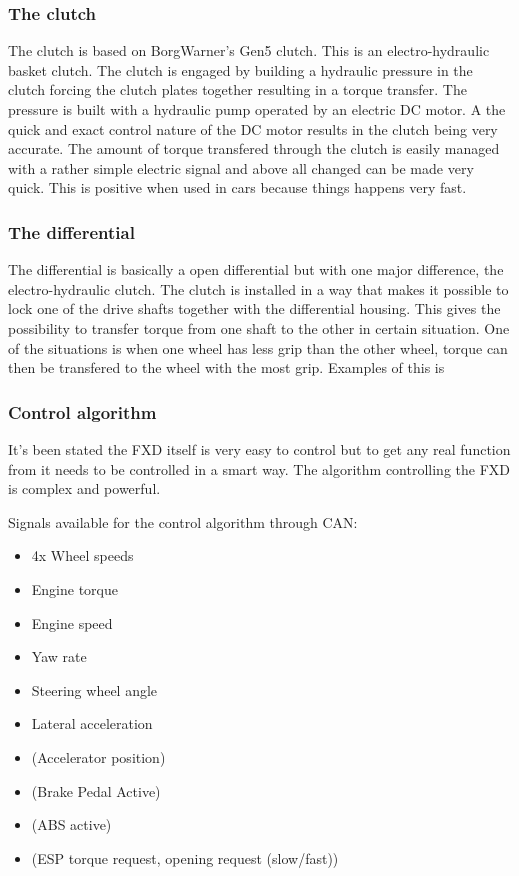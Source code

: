 \subsubsection{The clutch}
The clutch is based on BorgWarner's Gen5 clutch. This is an electro-hydraulic basket clutch. The clutch is engaged by building a hydraulic pressure in the clutch forcing the clutch plates together resulting in a torque transfer. The pressure is built with a hydraulic pump operated by an electric DC motor. A the quick and exact control nature of the DC motor results in the clutch being very accurate. The amount of torque transfered through the clutch is easily managed with a rather simple electric signal and above all changed can be made very quick. This is positive when used in cars because things happens very fast.

\subsubsection{The differential}
The differential is basically a open differential but with one major difference, the electro-hydraulic clutch. The clutch is installed in a way that makes it possible to lock one of the drive shafts together with the differential housing. This gives the possibility to transfer torque from one shaft to the other in certain situation. One of the situations is when one wheel has less grip than the other wheel, torque can then be transfered to the wheel with the most grip. Examples of this is 

\subsubsection{Control algorithm}
It's been stated the FXD itself is very easy to control but to get any real function from it needs to be controlled in a smart way. The algorithm controlling the FXD is complex and powerful.

Signals available for the control algorithm through CAN:
\begin{itemize}
	\item 4x Wheel speeds
	\item Engine torque
	\item Engine speed
	\item Yaw rate
	\item Steering wheel angle
	\item Lateral acceleration
	\item (Accelerator position)
	\item (Brake Pedal Active)
	\item (ABS active)
	\item (ESP torque request, opening request (slow/fast))
\end{itemize}


